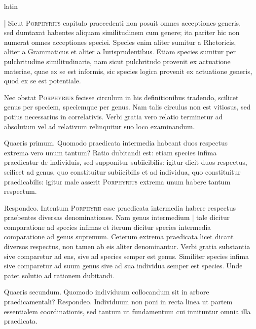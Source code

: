 \begin{otherlanguage*}{latin}
\pstart
{}
\pend

\pstart
\textnormal{|} Sicut \textsc{Porphyrius} capitulo praecedenti non posuit omnes acceptiones generis, sed dumtaxat habentes aliquam similitudinem cum genere; ita pariter hic non numerat omnes acceptiones speciei. Species enim aliter sumitur a Rhetoricis, aliter a Grammaticus et aliter a Iurisprudentibus. Etiam species sumitur per pulchritudine similitudinarie, nam sicut pulchritudo provenit ex actuatione materiae, quae ex se est informis, sic species logica provenit ex actuatione generis, quod ex se est potentiale. 
\pend

\pstart
Nec obstat \textsc{Porphyrius} fecisse circulum in his definitionibus tradendo, scilicet genus per speciem, speciemque per genus. Nam talis circulus non est vitiosus, sed potius necessarius in correlativis. Verbi gratia vero relatio terminetur ad absolutum vel ad relativum relinquitur suo loco examinandum. 
\pend

\pstart
Quaeris primum. Quomodo praedicata intermedia habeant duos respectus extrema vero unum tantum? Ratio dubitandi est:
etiam species infima praedicatur de individuis, sed supponitur subiicibilis:
igitur dicit duos respectus, scilicet ad genus, quo constituitur subiicibilis et ad individua, quo constituitur praedicabilis:
igitur male asserit \textsc{Porphyrius} extrema unum habere tantum respectum. 
\pend

\pstart
Respondeo. Intentum \textsc{Porphyrii} esse praedicata intermedia  habere respectus praebentes diversas denominationes. Nam genus intermedium \textnormal{|} tale dicitur comparatione ad species infimas et iterum dicitur species intermedia comparatione ad genus supremum. Ceterum extrema praedicata licet dicant diversos respectus, non tamen ab eis aliter denominantur. Verbi gratia substantia sive comparetur ad ens, sive ad species semper est genus. Similiter species infima sive comparetur ad suum genus sive ad sua individua semper est species. Unde patet solutio ad rationem dubitandi. 
\pend

\pstart
Quaeris secundum. Quomodo individuum collocandum sit in arbore praedicamentali? Respondeo. Individuum non poni in recta linea ut partem essentialem coordinationis, sed tantum ut fundamentum cui innituntur omnia illa praedicata. 
\pend


\end{otherlanguage*}
